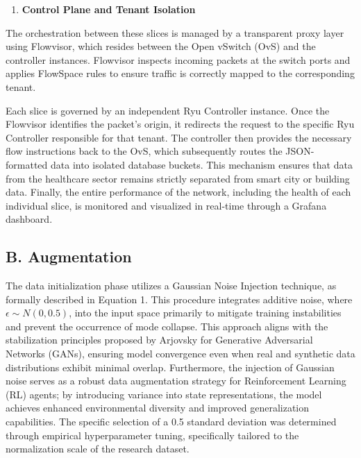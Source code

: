 \begin{enumerate}
\def\labelenumi{\arabic{enumi})}
\setcounter{enumi}{2}
\item
  \textbf{Control Plane and Tenant Isolation}
\end{enumerate}

The orchestration between these slices is managed by a transparent proxy layer using Flowvisor, which resides between the Open vSwitch (OvS) and the controller instances. Flowvisor inspects incoming packets at the switch ports and applies FlowSpace rules to ensure traffic is correctly mapped to the corresponding tenant.

Each slice is governed by an independent Ryu Controller instance. Once the Flowvisor identifies the packet's origin, it redirects the request to the specific Ryu Controller responsible for that tenant. The controller then provides the necessary flow instructions back to the OvS, which subsequently routes the JSON-formatted data into isolated database buckets. This mechanism ensures that data from the healthcare sector remains strictly separated from smart city or building data. Finally, the entire performance of the network, including the health of each individual slice, is monitored and visualized in real-time through a Grafana dashboard.

\subsection{B. Augmentation}\label{b.-augmentation}

The data initialization phase utilizes a Gaussian Noise Injection technique, as formally described in Equation 1. This procedure integrates additive noise, where \(\epsilon \sim N(0,0.5)\), into the input space primarily to mitigate training instabilities and prevent the occurrence of mode collapse. This approach aligns with the stabilization principles proposed by Arjovsky for Generative Adversarial Networks (GANs), ensuring model convergence even when real and synthetic data distributions exhibit minimal overlap\cite{b41}. Furthermore, the injection of Gaussian noise serves as a robust data augmentation strategy for Reinforcement Learning (RL) agents; by introducing variance into state representations, the model achieves enhanced environmental diversity and improved generalization capabilities. The specific selection of a 0.5 standard deviation was determined through empirical hyperparameter tuning, specifically tailored to the normalization scale of the research dataset.

